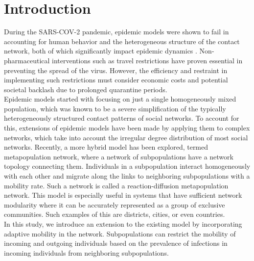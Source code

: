 
% 
\section{Introduction}

During the SARS-COV-2 pandemic, epidemic models were shown to fail in accounting for human behavior and the heterogeneous structure of the contact network, both of which significantly impact epidemic dynamics \cite{Lewis2021wrong}. Non-pharmaceutical interventions such as travel restrictions have proven essential in preventing the spread of the virus. However, the efficiency and restraint in implementing such restrictions must consider economic costs and potential societal backlash due to prolonged quarantine periods.
\\
Epidemic models started with focusing on just a single homogeneously mixed population, which was known to be a severe simplification of the typically heterogeneously structured contact patterns of social networks. To account for this, extensions of epidemic models have been made by applying them to complex networks, which take into account the irregular degree distribution of most social networks. Recently, a more hybrid model has been explored, termed metapopulation network, where a network of subpopulations have a network topology connecting them. Individuals in a subpopulation interact homogeneously with each other and migrate along the links to neighboring subpopulations with a mobility rate. Such a network is called a reaction-diffusion metapopulation network. This model is especially useful in systems that have sufficient network modularity where it can be accurately represented as a group of exclusive communities. Such examples of this are districts, cities, or even countries. 
\\
In this study, we introduce an extension to the existing model by incorporating adaptive mobility in the network. Subpopulations can restrict the mobility of incoming and outgoing individuals based on the prevalence of infections in incoming individuals from neighboring subpopulations.
% 